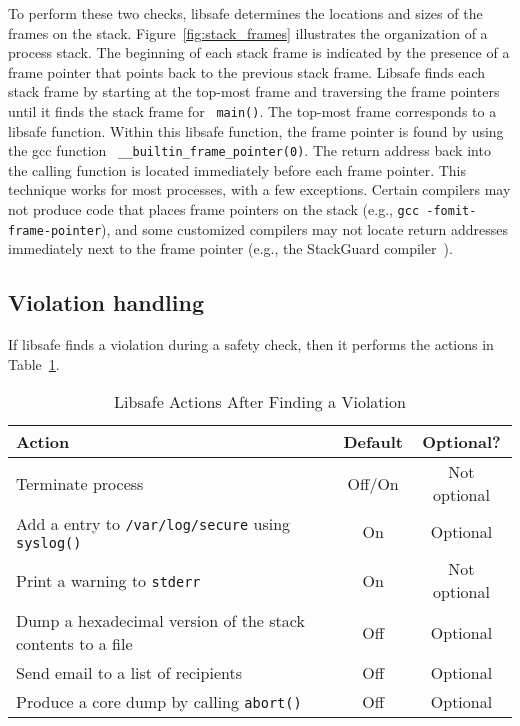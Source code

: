 \documentclass[]{article}
\begin{document}
To perform these two checks, libsafe determines the locations and sizes of the
frames on the stack.  Figure~\ref{fig:stack_frames} illustrates the
organization of a process stack.  The beginning of each stack frame is
indicated by the presence of a frame pointer that points back to the previous
stack frame.  Libsafe finds each stack frame by starting at the top-most frame
and traversing the frame pointers until it finds the stack frame for {\tt
main()}.  The top-most frame corresponds to a libsafe function.  Within this
libsafe function, the frame pointer is found by using the gcc function {\tt
\_\_builtin\_frame\_pointer(0)}.  The return address back into the calling
function is located immediately before each frame pointer.  This technique
works for most processes, with a few exceptions.  Certain compilers may not
produce code that places frame pointers on the stack (e.g., {\tt gcc
-fomit-frame-pointer}), and some customized compilers may not locate return
addresses immediately next to the frame pointer (e.g., the StackGuard
compiler~\cite{stackguard98}).


\subsection{Violation handling}
\label{subsec:handling}

If libsafe finds a violation during a safety check, then it performs the
actions in Table~\ref{tab:actions}.

\begin{table}[htbp]
\begin{center}
\caption{Libsafe Actions After Finding a Violation}
\label{tab:actions}
\begin{tabular}{|l||c|c|} \hline
Action	& Default   & Optional? \\ \hline\hline
Terminate process
	& Off/On    & Not optional  \\ \hline
Add a entry to {\tt /var/log/secure} using {\tt syslog()}
	& On	    & Optional \\ \hline
Print a warning to {\tt stderr}
	& On	    & Not optional \\ \hline
Dump a hexadecimal version of the stack contents to a file
	& Off	    & Optional \\ \hline
Send email to a list of recipients
	& Off	    & Optional \\ \hline
Produce a core dump by calling {\tt abort()}
	& Off	    & Optional \\ \hline
\end{tabular}
\end{center}
\end{table}
\end{document}

